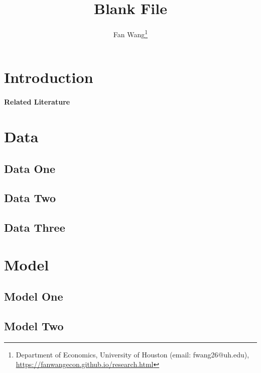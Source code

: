 \documentclass[12pt,english]{article}
\begin{document}
\title{Blank File}
\author{Fan Wang\thanks{Department of Economics, University of Houston (email: fwang26@uh.edu), \url{https://fanwangecon.github.io/research.html}}}
\maketitle


\begin{abstract}
\singlespacing \abstractB
\end{abstract}
\vfill
\pagebreak{}

\section{Introduction}

\paragraph{Related Literature}


\section{Data}
\subsection{Data One}

\subsection{Data Two}

\subsection{Data Three}


\section{Model}
\subsection{Model One}

\subsection{Model Two}

\end{document}
